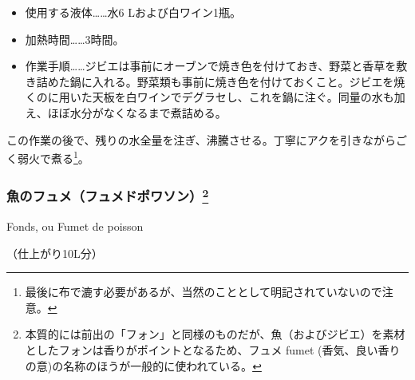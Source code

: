 \begin{recette}
\begin{itemize}
\item
  使用する液体\ldots{}\ldots{}水6 Lおよび白ワイン1瓶。
\item
  加熱時間\ldots{}\ldots{}3時間。
\item
  作業手順\ldots{}\ldots{}ジビエは事前にオーブンで焼き色を付けておき、野菜と香草を敷き詰めた鍋に入れる。野菜類も事前に焼き色を付けておくこと。ジビエを焼くのに用いた天板を白ワインでデグラセし、これを鍋に注ぐ。同量の水も加え、ほぼ水分がなくなるまで煮詰める。
\end{itemize}

この作業の後で、残りの水全量を注ぎ、沸騰させる。丁寧にアクを引きながらごく弱火で煮る\footnote{最後に布で漉す必要があるが、当然のこととして明記されていないので注意。}。

\atoaki{}

\hypertarget{fumet-de-poisson}{%
\subsubsection[魚のフュメ（フュメドポワソン）]{\texorpdfstring{魚のフュメ（フュメドポワソン）\footnote{本質的には前出の「フォン」と同様のものだが、魚（およびジビエ）を素材としたフォンは香りがポイントとなるため、フュメ
  fumet (香気、良い香りの意)の名称のほうが一般的に使われている。}}{魚のフュメ（フュメドポワソン）}}\label{fumet-de-poisson}}

\begin{frsubenv}

Fonds, ou Fumet de poisson

\end{frsubenv}

 

（仕上がり10L分）


\end{recette}

